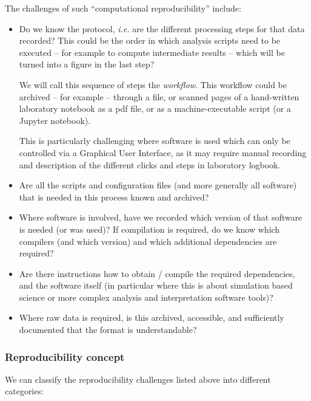 The challenges of such ``computational reproducibility'' include:
\begin{itemize}
\item Do we know the protocol, \emph{i.e.} are the different
  processing steps for that data recorded? This could be the order in which
  analysis scripts need to be executed -- for example to compute intermediate
  results -- which will be turned into a figure in the last step?

We will call this sequence of steps the \emph{workflow}. This workflow could be
archived -- for example -- through a  file, or scanned
pages of a hand-written laboratory notebook as a pdf file, or as a
machine-executable script (or a Jupyter notebook).

This is particularly challenging where software is used which can only be
controlled via a Graphical User Interface, as it may require manual recording
and description of the different clicks and steps in laboratory logbook.

\item Are all the scripts and configuration files (and more generally all
software) that is needed in this process known and archived?

\item Where software is involved, have we recorded which version of that
software is needed (or was used)? If compilation is required, do we know which
compilers (and which version) and which additional dependencies are required?

\item Are there instructions how to obtain / compile the required dependencies,
and the software itself (in particular where this is about simulation based
science or more complex analysis and interpretation software tools)?

\item Where raw data is required, is this archived, accessible, and sufficiently
documented that the format is understandable?
\end{itemize}


\subsubsection{Reproducibility concept}\label{sec:reproducibility-concept}

We can classify the reproducibility challenges listed above into different categories:

